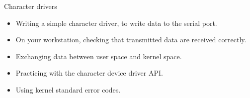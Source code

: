 \setuplabframe
{Character drivers}
{
  \begin{itemize}
  \item Writing a simple character driver, to write data to the serial
    port.
  \item On your workstation, checking that transmitted data are
    received correctly.
  \item Exchanging data between user space and kernel space.
  \item Practicing with the character device driver API.
  \item Using kernel standard error codes.
  \end{itemize}
}
